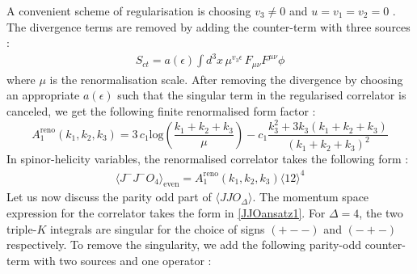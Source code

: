\documentclass[a4paper,11pt]{article}
\begin{document}
%
 A convenient scheme of regularisation is choosing $v_3\ne 0$ and $u=v_1=v_2=0$ \cite{Bzowski:2018fql}.
 The divergence terms are removed by adding the counter-term with three sources \cite{Bzowski:2018fql}:
%
\begin{align}
S_{ct}=a(\epsilon)\int d^{3}x\,\mu^{v_3\epsilon}\,F_{\mu\nu}F^{\mu\nu}\phi
\end{align}
%
where $\mu$ is the renormalisation scale. After removing the divergence by choosing an appropriate $a(\epsilon)$ such that the singular term in the regularised correlator is canceled, we get the following finite renormalised form factor  :
\begin{equation}\label{jjo4form}
A_1^{\text{reno}}(k_1, k_2, k_3)=3\,c_1\text{log}\left(\frac{k_1+k_2+k_3}{\mu}\right)-c_1\frac{k_3^2+3k_3(k_1+k_2+k_3)}{(k_1+k_2+k_3)^2}
\end{equation}
%
In spinor-helicity variables, the renormalised correlator takes the following form :
%
\begin{align}
\langle J^{-}J^{-}O_{4}\rangle_{\text{even}}=A_1^{\text{reno}}(k_1,k_2,k_3)\langle 12\rangle^4
\end{align}
%
Let us now discuss the parity odd part of $\langle JJO_\Delta\rangle$. The momentum space expression for the correlator takes the form in \eqref{JJOansatz1}. %
%
% 
For $\Delta=4$, the two triple-$K$ integrals are singular for the choice of signs $(+--)$ and $(-+-)$ respectively. To remove the singularity, we add the following parity-odd counter-term with two sources and one operator : 
\end{document}
